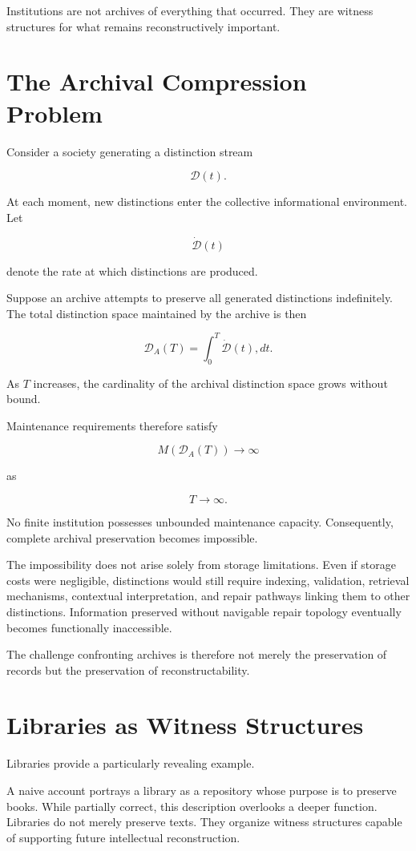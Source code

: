 \documentclass[12pt,oneside]{book}
\theoremstyle{plain} \newtheorem{theorem}{Theorem}[chapter] \newtheorem{lemma}[theorem]{Lemma} \newtheorem{proposition}[theorem]{Proposition} \newtheorem{corollary}[theorem]{Corollary}
\theoremstyle{definition} \newtheorem{definition}[theorem]{Definition} \newtheorem{axiom}[theorem]{Axiom} \newtheorem{construction}[theorem]{Construction}
\theoremstyle{remark} \newtheorem{remark}[theorem]{Remark} \newtheorem{example}[theorem]{Example}
\newcommand{\D}{\mathcal{D}} \newcommand{\R}{\mathcal{R}} \newcommand{\F}{\mathcal{F}} \newcommand{\U}{\mathcal{U}} \newcommand{\M}{\mathcal{M}} \newcommand{\G}{\Gamma}
\begin{document}
Institutions are not archives of everything that occurred. They are witness structures for what remains reconstructively important.

\section{The Archival Compression Problem}

Consider a society generating a distinction stream

\[
\D(t).
\]

At each moment, new distinctions enter the collective informational environment. Let

\[
\dot{\D}(t)
\]

denote the rate at which distinctions are produced.

Suppose an archive attempts to preserve all generated distinctions indefinitely. The total distinction space maintained by the archive is then

\[
\D_A(T)
=
\int_0^T
\dot{\D}(t),dt.
\]

As $T$ increases, the cardinality of the archival distinction space grows without bound.

Maintenance requirements therefore satisfy

\[
M(\D_A(T))
\rightarrow
\infty
\]

as

\[
T
\rightarrow
\infty.
\]

No finite institution possesses unbounded maintenance capacity. Consequently, complete archival preservation becomes impossible.

The impossibility does not arise solely from storage limitations. Even if storage costs were negligible, distinctions would still require indexing, validation, retrieval mechanisms, contextual interpretation, and repair pathways linking them to other distinctions. Information preserved without navigable repair topology eventually becomes functionally inaccessible.

The challenge confronting archives is therefore not merely the preservation of records but the preservation of reconstructability.

\section{Libraries as Witness Structures}

Libraries provide a particularly revealing example.

A naive account portrays a library as a repository whose purpose is to preserve books. While partially correct, this description overlooks a deeper function. Libraries do not merely preserve texts. They organize witness structures capable of supporting future intellectual reconstruction.
\end{document}
